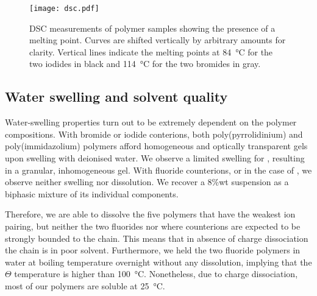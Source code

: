 \documentclass[journal=jacsat,manuscript=article]{achemso}
\begin{document}
\begin{figure}
\texttt{[image: dsc.pdf]}
\caption{DSC measurements of polymer samples showing the presence of a melting point. Curves are shifted vertically by arbitrary amounts for clarity. Vertical lines indicate the melting points at \SI{84}{\celsius} for the two iodides in black and \SI{114}{\celsius} for the two bromides in gray.}
\label{fig:dsc}
\end{figure}

\subsection{Water swelling and solvent quality}
Water-swelling properties turn out to be extremely dependent on the polymer compositions. With bromide or iodide conterions, both poly(pyrrolidinium) and poly(immidazolium) polymers afford homogeneous and optically transparent gels upon swelling with deionised water. We observe a limited swelling for , resulting in a granular, inhomogeneous gel. With fluoride counterions, or in the case of , we observe neither swelling nor dissolution. We recover a 8\%wt suspension as a biphasic mixture of its individual components.

Therefore, we are able to dissolve the five polymers that have the weakest ion pairing, but neither the two fluorides nor  where counterions are expected to be strongly bounded to the chain. This means that in absence of charge dissociation the chain is in poor solvent. Furthermore, we held the two fluoride polymers in water at boiling temperature overnight without any dissolution, implying that the $\Theta$ temperature is higher than \SI{100}{\celsius}. Nonetheless, due to charge dissociation, most of our polymers are soluble at \SI{25}{\celsius}.


\end{document}
